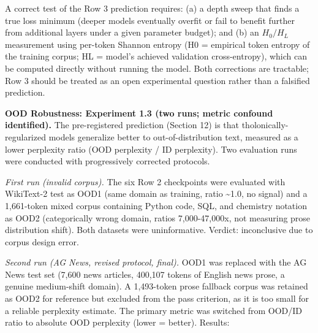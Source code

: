 \documentclass[
  11pt,
  letterpaper,
]{article}
\begin{document}
A correct test of the Row 3 prediction requires: (a) a depth sweep that
finds a true loss minimum (deeper models eventually overfit or fail to
benefit further from additional layers under a given parameter budget);
and (b) an \(H_0/H_L\) measurement using per-token Shannon entropy (H0 =
empirical token entropy of the training corpus; HL = model's achieved
validation cross-entropy), which can be computed directly without
running the model. Both corrections are tractable; Row 3 should be
treated as an open experimental question rather than a falsified
prediction.

\textbf{OOD Robustness: Experiment 1.3 (two runs; metric confound
identified).} The pre-registered prediction (Section 12) is that
tholonically-regularized models generalize better to out-of-distribution
text, measured as a lower perplexity ratio (OOD perplexity / ID
perplexity). Two evaluation runs were conducted with progressively
corrected protocols.

\emph{First run (invalid corpus).} The six Row 2 checkpoints were
evaluated with WikiText-2 test as OOD1 (same domain as training, ratio
\textasciitilde1.0, no signal) and a 1,661-token mixed corpus containing
Python code, SQL, and chemistry notation as OOD2 (categorically wrong
domain, ratios 7,000-47,000x, not measuring prose distribution shift).
Both datasets were uninformative. Verdict: inconclusive due to corpus
design error.

\emph{Second run (AG News, revised protocol, final).} OOD1 was replaced
with the AG News test set (7,600 news articles, 400,107 tokens of
English news prose, a genuine medium-shift domain). A 1,493-token prose
fallback corpus was retained as OOD2 for reference but excluded from the
pass criterion, as it is too small for a reliable perplexity estimate.
The primary metric was switched from OOD/ID ratio to absolute OOD
perplexity (lower = better). Results:
\end{document}
